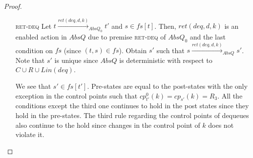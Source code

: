 \begin{proof}
\begin{itemize}
\item[\textsc{ret-deq}] Let $t \xrightarrow{ret(deq,d,k)}_{AbsQ_0} t'$ and $s \in fs[t]$. Then, $ret(deq,d,k)$ is an enabled action in $AbsQ$ due to premise \textsc{ret-deq} of $AbsQ_0$ and the last condition on $fs$ (since $(t,s) \in fs$). Obtain $s'$ such that $s \xrightarrow{ret(deq,d,k)}_{AbsQ} s'$. Note that $s'$ is unique since $AbsQ$ is deterministic with respect to $C \cup R \cup Lin(deq)$.

We see that $s' \in fs[t']$. Pre-states are equal to the post-states with the only exception in the control points such that $cp^0_{t'}(k) = cp_{s'}(k) = R_3$. All the conditions except the third one continues to hold in the post states since they hold in the pre-states. The third rule regarding the control points of dequeues also continue to the hold since changes in the control point of $k$ does not violate it.
\end{itemize}
\end{proof}